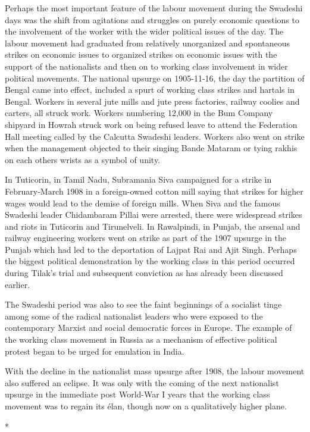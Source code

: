 \begin{multicols}{2}
Perhaps the most important feature of the labour movement during the Swadeshi days was the shift from agitations and struggles on purely economic questions to the involvement of the worker with the wider political issues of the day. The labour movement had graduated from relatively unorganized and spontaneous strikes on economic issues to organized strikes on economic issues with the support of the nationalists and then on to working class involvement in wider political movements. The national upsurge on 1905-11-16, the day the partition of Bengal came into effect, included a spurt of working class strikes and hartals in Bengal. Workers in several jute mills and jute press factories, railway coolies and carters, all struck work. Workers numbering 12,000 in the Bum Company shipyard in Howrah struck work on being refused leave to attend the Federation Hall meeting called by the Calcutta Swadeshi leaders. Workers also went on strike when the management objected to their singing Bande Mataram or tying rakhis on each others wrists as a symbol of unity.

In Tuticorin, in Tamil Nadu, Subramania Siva campaigned for a strike in February-March 1908 in a foreign-owned cotton mill saying that strikes for higher wages would lead to the demise of foreign mills. When Siva and the famous Swadeshi leader Chidambaram Pillai were arrested, there were widespread strikes and riots in Tuticorin and Tirunelveli. In Rawalpindi, in Punjab, the arsenal and railway engineering workers went on strike as part of the 1907 upsurge in the Punjab which had led to the deportation of Lajpat Rai and Ajit Singh. Perhaps the biggest political demonstration by the working class in this period occurred during Tilak's trial and subsequent conviction as has already been discussed earlier.

The Swadeshi period was also to see the faint beginnings of a socialist tinge among some of the radical nationalist leaders who were exposed to the contemporary Marxist and social democratic forces in Europe. The example of the working class movement in Russia as a mechanism of effective political protest began to be urged for emulation in India.

With the decline in the nationalist mass upsurge after 1908, the labour movement also suffered an eclipse. It was only with the coming of the next nationalist upsurge in the immediate post World-War I years that the working class movement was to regain its élan, though now on a qualitatively higher plane.

\begin{center}*\end{center}


\end{multicols}
